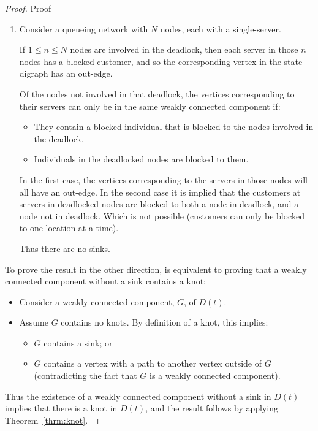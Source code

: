 \documentclass{article}
\numberwithin{equation}{section}
\begin{document}
\begin{proof}{Proof}
\begin{enumerate}
  \item
  Consider a queueing network with $N$ nodes, each with a single-server.

  If $1 \leq n \leq N$ nodes are involved in the deadlock, then each server in
  those $n$ nodes has a blocked customer, and so the corresponding vertex in the
  state digraph has an out-edge.

  Of the nodes not involved in that deadlock, the vertices corresponding to
  their servers can only be in the same weakly connected component if:

  \begin{itemize}
    \item They contain a blocked individual that is blocked to the nodes
    involved in the deadlock.
    \item Individuals in the deadlocked nodes are blocked to them.
  \end{itemize}

  In the first case, the vertices corresponding to the servers in those nodes
  will all have an out-edge.
  In the second case it is implied that the customers at servers in deadlocked
  nodes are blocked to both a node in deadlock, and a node not in deadlock.
  Which is not possible (customers can only be blocked to one location at a
  time).

  Thus there are no sinks.
  \end{enumerate}

To prove the result in the other direction, is equivalent to proving that a
weakly connected component without a sink contains a knot:

\begin{itemize}
  \item Consider a weakly connected component, $G$, of $D(t)$.
  \item Assume $G$ contains no knots. By definition of a knot, this implies:
  \begin{itemize}
    \item $G$ contains a sink; or
    \item $G$ contains a vertex with a path to another vertex outside of $G$
    (contradicting the fact that $G$ is a weakly connected component).
  \end{itemize}
\end{itemize}

Thus the existence of a weakly connected component without a sink in $D(t)$
implies that there is a knot in $D(t)$, and the result follows by applying
Theorem~\ref{thrm:knot}.
\end{proof}
\end{document}
